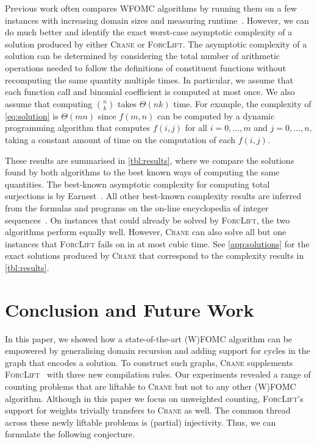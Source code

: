 \documentclass{article}
\theoremstyle{definition}
\begin{document}
Previous work often compares WFOMC algorithms by running them on a few instances
with increasing domain sizes and measuring
runtime~\cite{DBLP:conf/nips/Broeck11,DBLP:conf/ijcai/BroeckTMDR11,DBLP:conf/aaai/BroeckD12}.
However, we can do much better and identify the exact worst-case asymptotic
complexity of a solution produced by either \textsc{Crane} or \textsc{ForcLift}.
The asymptotic complexity of a solution can be determined by considering the
total number of arithmetic operations needed to follow the definitions of
constituent functions without recomputing the same quantity multiple times. In
particular, we assume that each function call and binomial coefficient is
computed at most once. We also assume that computing $\binom{n}{k}$ takes
$\Theta(nk)$ time. For example, the complexity of \cref{eq:solution} is
$\Theta(mn)$ since $f(m, n)$ can be computed by a dynamic programming algorithm
that computes $f(i, j)$ for all $i = 0, \dots, m$ and $j = 0, \dots, n$, taking
a constant amount of time on the computation of each $f(i, j)$.

These results are summarised in \cref{tbl:results}, where we compare the
solutions found by both algorithms to the best known ways of computing the same
quantities. The best-known asymptotic complexity for computing total surjections
is by Earnest~. All other best-known complexity results are
inferred from the formulas and programs on the on-line encyclopedia of integer
sequences~\cite{oeis}. On instances that could already be solved by
\textsc{ForcLift}, the two algorithms perform equally well. However,
\textsc{Crane} can also solve all but one instances that \textsc{ForcLift} fails
on in at most cubic time. See \cref{app:solutions} for the exact solutions
produced by \textsc{Crane} that correspond to the complexity results in
\cref{tbl:results}.

\section{Conclusion and Future Work}\label{sec:conclusion}


In this paper, we showed how a state-of-the-art (W)FOMC algorithm can be
empowered by generalising domain recursion and adding support for cycles in the
graph that encodes a solution. To construct such graphs, \textsc{Crane}
supplements \textsc{ForcLift}~\cite{DBLP:conf/ijcai/BroeckTMDR11} with three
new compilation rules. Our experiments revealed a range of counting problems
that are liftable to \textsc{Crane} but not to any other (W)FOMC algorithm.
Although in this paper we focus on unweighted counting, \textsc{ForcLift}'s
support for weights trivially transfers to \textsc{Crane} as well. The common
thread across these newly liftable problems is (partial) injectivity. Thus, we
can formulate the following conjecture.
\end{document}
